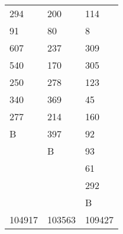 \documentclass[bwprint,fontset=windows]{gmcmthesis}
\begin{document}
\begin{table}[htp!]
\begin{minipage}[h]{0.48\linewidth}
\begin{tabularx}{0.9\textwidth}{|Y|Y|Y|}
  294    & 200     & 114   \\
   91     & 80     & 8   \\
   607    & 237     & 309   \\
   540    & 170    & 305  \\
   250    & 278    & 123  \\
   340    & 369     & 45   \\
   277    & 214    & 160  \\
  B      & 397   & 92 \\
        &  B     &  93      \\
         &         &  61      \\
        &         &   292     \\
        &         &   B     \\
 104917  &  103563  &109427 \\
\hline
\end{tabularx}
\end{minipage}
\end{table}
\end{document}
